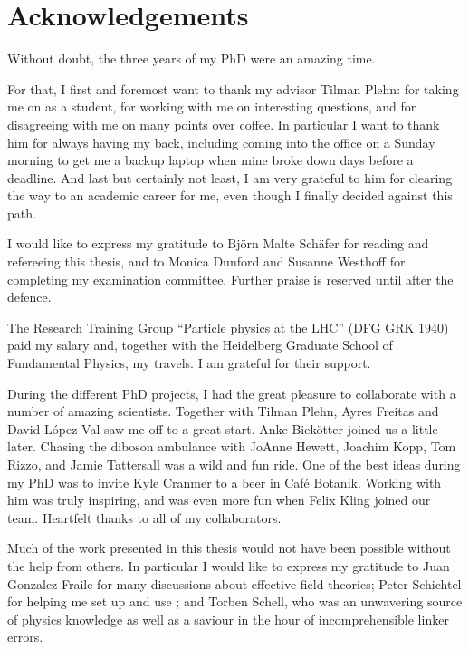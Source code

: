 

\chapter*{Acknowledgements}

Without doubt, the three years of my PhD were an amazing time.

For that, I first and foremost want to thank my advisor Tilman Plehn:
for taking me on as a student, for working with me on interesting
questions, and for disagreeing with me on many points over coffee. In
particular I want to thank him for always having my back, including
coming into the office on a Sunday morning to get me a backup laptop
when mine broke down days before a deadline. And last but certainly
not least, I am very grateful to him for clearing the way to an
academic career for me, even though I finally decided against this
path.

I would like to express my gratitude to Bj\"orn Malte Sch\"afer for
reading and refereeing this thesis, and to Monica Dunford and Susanne
Westhoff for completing my examination committee. Further praise is
reserved until after the defence.

The Research Training Group ``Particle physics at the LHC'' (DFG GRK
1940) paid my salary and, together with the Heidelberg Graduate School
of Fundamental Physics, my travels. I am grateful for their support.

During the different PhD projects, I had the great pleasure to
collaborate with a number of amazing scientists. Together with Tilman
Plehn, Ayres Freitas and David L\'opez-Val saw me off to a great
start. Anke Biek\"otter joined us a little later. Chasing the diboson
ambulance with JoAnne Hewett, Joachim Kopp, Tom Rizzo, and Jamie
Tattersall was a wild and fun ride. One of the best ideas during my
PhD was to invite Kyle Cranmer to a beer in Caf\'e Botanik. Working
with him was truly inspiring, and was even more fun when Felix Kling
joined our team.  Heartfelt thanks to all of my collaborators.

Much of the work presented in this thesis would not have been possible
without the help from others. In particular I would like to express my
gratitude to Juan Gonzalez-Fraile for many discussions about effective
field theories; Peter Schichtel for helping me set up and use
; and Torben Schell, who was an unwavering source of
physics knowledge as well as a saviour in the hour of incomprehensible
linker errors.

